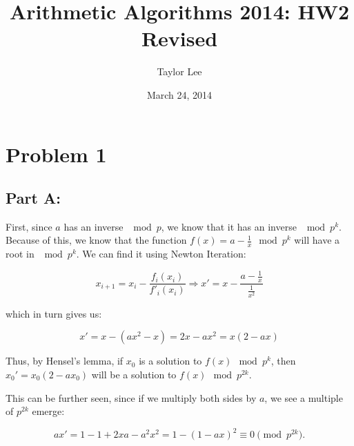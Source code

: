 \documentclass[12pt]{article}
\theoremstyle{moo}
\begin{document}
\fontseries {\seriesdefault}
\fontshape {\shapedefault}
\selectfont

\title{ Arithmetic Algorithms 2014: HW2 Revised}
\date{March 24, 2014}         %
\author{Taylor Lee}      %
\maketitle                      %




\section*{Problem 1}


\subsection*{Part A:}
First, since $a$ has an inverse $\mod{p}$, we know that it has an inverse $\mod{p^k}$. Because of this, we know that the function $f(x) = a - \frac{1}{x} \mod{p^k}$ will have a root in $\mod{p^k}$. We can find it using Newton Iteration:

\[
x_{i+1} =  x_i - \frac{f_i(x_i)}{f'_i(x_i)}  \Rightarrow x' = x - \frac{a-\frac{1}{x}}{\frac{1}{x^2}}
\]

which in turn gives us:


\[
x' = x - \left( ax^2 - x \right) = 2x - ax^2 = x \left( 2-ax \right)
\]

Thus, by Hensel's lemma, if $x_0$ is a solution to $f(x) \mod{p^k}$, then $x_0'=x_0 \left( 2 - ax_0 \right)$ will be a solution to $f(x) \mod{p^{2k}}$.

This can be further seen, since if we multiply both sides by $a$, we see a multiple of $p^{2k}$ emerge:

\[
ax' = 1 - 1 + 2xa - a^2x^2 = 1 - \left(1 - ax \right)^2 \equiv 0 \pmod{p^{2k}}. 
\]
\end{document}
